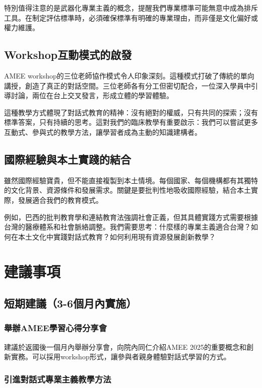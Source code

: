 \documentclass[12pt,a4paper]{article}
\begin{document}
特別值得注意的是武器化專業主義的概念，提醒我們專業標準可能無意中成為排斥工具。在制定評估標準時，必須確保標準有明確的專業理由，而非僅是文化偏好或權力維護。

\subsection{Workshop互動模式的啟發}

AMEE workshop的三位老師協作模式令人印象深刻。這種模式打破了傳統的單向講授，創造了真正的對話空間。三位老師各有分工但密切配合，一位深入學員中引導討論，兩位在台上交叉發言，形成立體的學習體驗。

這種教學方式體現了對話式教育的精神：沒有絕對的權威，只有共同的探索；沒有標準答案，只有持續的思考。這對我們的臨床教學有重要啟示：我們可以嘗試更多互動式、參與式的教學方法，讓學習者成為主動的知識建構者。

\subsection{國際經驗與本土實踐的結合}

雖然國際經驗寶貴，但不能直接複製到本土情境。每個國家、每個機構都有其獨特的文化背景、資源條件和發展需求。關鍵是要批判性地吸收國際經驗，結合本土實際，發展適合我們的教育模式。

例如，巴西的批判教育學和連結教育法強調社會正義，但其具體實踐方式需要根據台灣的醫療體系和社會脈絡調整。我們需要思考：什麼樣的專業主義適合台灣？如何在本土文化中實踐對話式教育？如何利用現有資源發展創新教學？

\section{建議事項}

\subsection{短期建議（3-6個月內實施）}

\subsubsection{舉辦AMEE學習心得分享會}

建議於返國後一個月內舉辦分享會，向院內同仁介紹AMEE 2025的重要概念和創新實務。可以採用workshop形式，讓參與者親身體驗對話式學習的方式。

\subsubsection{引進對話式專業主義教學方法}
\end{document}
